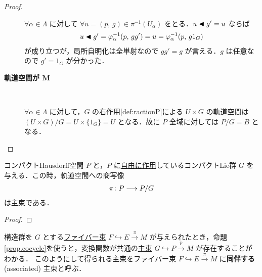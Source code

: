 \documentclass[TQFT_main]{subfiles}
\begin{document}
\begin{proof}
\begin{description}
            $\forall \alpha \in \Lambda$ に対して
            $\forall u = (p,\, g) \in \pi^{-1}(U_\alpha)$ をとる．$u \blacktriangleleft g' = u$ ならば
            \begin{align}
                u \blacktriangleleft g' = \varphi_\alpha^{-1} (p,\, gg') = u = \varphi_\alpha^{-1}(p,\, g 1_G)
            \end{align}
            が成り立つが，局所自明化は全単射なので $gg' = g$ が言える．$g$ は任意なので $g' = 1_G$ が分かった．
        \item[\textbf{軌道空間が $\bm{M}$}]　 
        
            $\forall \alpha \in \Lambda$ に対して，$G$ の右作用\eqref{def:ractionP}による $U \times G$ の軌道空間は $(U \times G) / G = U \times \{1_G\} = U$ となる．故に $P$ 全域に対しては $P/G = B$ となる．
	\end{description}
\end{proof}

\begin{mytheo}[label=thm:principal]{}
    コンパクトHausdorff空間 $P$ と，$P$ に\hyperref[def:Lie-action]{自由に作用}しているコンパクトLie群 $G$ を与える．この時，軌道空間への商写像
    \begin{align}
        \pi \colon P \longrightarrow P/G
    \end{align}
    は\hyperref[def.PFD]{主束}である．
\end{mytheo}

\begin{proof}
    
\end{proof}

構造群を $G$ とする\hyperref[def.fiber-1]{ファイバー束} $F \hookrightarrow E \xrightarrow{\pi} M$ が与えられたとき，命題\ref{prop.cocycle}を使うと，変換関数が共通の\hyperref[def.PFD]{主束} $G \hookrightarrow P \xrightarrow{p} M$ が存在することがわかる．
このようにして得られる主束をファイバー束 $F \hookrightarrow E \xrightarrow{\pi} M$ に\textbf{同伴する} (associated) 主束と呼ぶ．
\end{document}
